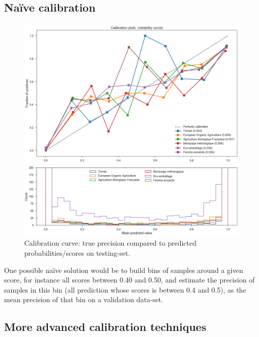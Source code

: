 \subsection{Naïve calibration}

\begin{figure}[H]
\centering
\includegraphics[scale=0.37]{./images/calibration/islabeledby_calibration_curve.png}
\caption{Calibration curve: true precision compared to predicted probabilities/scores on testing-set.}
\end{figure}

One possible naïve solution would be to build bins of samples around a given score, for instance all scores between 0.40 and 0.50, and estimate the precision of samples in this bin (all prediction whose scores is between 0.4 and 0.5), as the mean precision of that bin on a validation data-set.

\subsection{More advanced calibration techniques}

